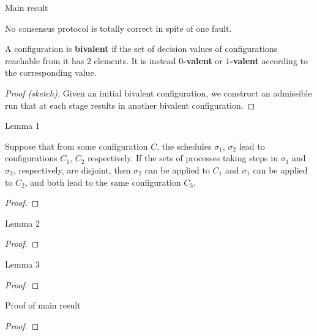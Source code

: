 \documentclass[12pt]{beamer}
\begin{document}
  \begin{frame}{Main result}
    \begin{theorem}
      No consensus protocol is totally correct in spite of one fault.
    \end{theorem}

    \vspace{0.25cm}

    A configuration is \textbf{bivalent} if the set of decision values of configurations reachable from it has \(2\) elements. It is instead \textbf{\(0\)-valent} or \textbf{\(1\)-valent} according to the corresponding value.

    \vspace{0.25cm}

    \begin{proof}[Proof (sketch)]
      Given an initial bivalent configuration, we construct an admissible run that at each stage results in another bivalent configuration.
    \end{proof}
  \end{frame}

  \begin{frame}{Lemma 1}
    \begin{lemma}
      Suppose that from some configuration \(C\), the schedules \(\sigma_1\), \(\sigma_2\) lead to configurations \(C_1\), \(C_2\) respectively. If the sets of processes taking steps in \(\sigma_1\) and \(\sigma_2\), respectively, are disjoint, then \(\sigma_2\) can be applied to \(C_1\) and \(\sigma_1\) can be applied to \(C_2\), and both lead to the same configuration \(C_3\).
    \end{lemma}

    \vspace{0.25cm}

    \begin{proof}
    \end{proof}
  \end{frame}

  \begin{frame}{Lemma 2}
    \begin{lemma}
    \end{lemma}
    \begin{proof}
    \end{proof}
  \end{frame}

  \begin{frame}{Lemma 3}
    \begin{lemma}
    \end{lemma}
    \begin{proof}
    \end{proof}
  \end{frame}

  \begin{frame}{Proof of main result}
    \begin{proof}
    \end{proof}
  \end{frame}
\end{document}
